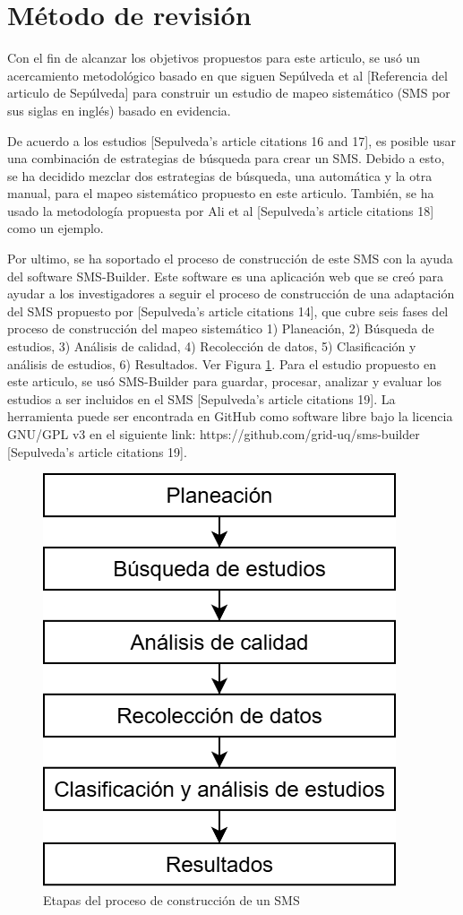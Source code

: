 \section{Método de revisión}\label{sec:metodo-revision}
Con el fin de alcanzar los objetivos propuestos para este articulo, se usó un acercamiento metodológico basado en que siguen Sepúlveda et al [Referencia del articulo de Sepúlveda] para construir un estudio de mapeo sistemático (SMS por sus siglas en inglés) basado en evidencia.

De acuerdo a los estudios [Sepulveda's article citations 16 and 17], es posible usar una combinación de estrategias de búsqueda para crear un SMS. Debido a esto, se ha decidido mezclar dos estrategias de búsqueda, una automática y la otra manual, para el mapeo sistemático propuesto en este articulo. También, se ha usado la metodología propuesta por Ali et al [Sepulveda's article citations 18] como un ejemplo.

Por ultimo, se ha soportado el proceso de construcción de este SMS con la ayuda del software SMS-Builder. Este software es una aplicación web que se creó para ayudar a los investigadores a seguir el proceso de construcción de una adaptación del SMS propuesto por [Sepulveda's article citations 14], que cubre seis fases del proceso de construcción del mapeo sistemático 1) Planeación, 2) Búsqueda de estudios, 3) Análisis de calidad, 4) Recolección de datos, 5) Clasificación y análisis de estudios, 6) Resultados. Ver Figura \ref{figure:Stages}. Para el estudio propuesto en este articulo, se usó SMS-Builder para guardar, procesar, analizar y evaluar los estudios a ser incluidos en el SMS [Sepulveda's article citations 19]. La herramienta puede ser encontrada en GitHub como software libre bajo la licencia GNU/GPL v3 en el siguiente link: https://github.com/grid-uq/sms-builder [Sepulveda's article citations 19].

\begin{figure}[htbp]
	\centering
	\includegraphics[width=0.6\linewidth]{resources/figures/sms-Etapas.drawio.png}
	\caption{Etapas del proceso de construcción de un SMS}
	\label{figure:Stages}
\end{figure}

